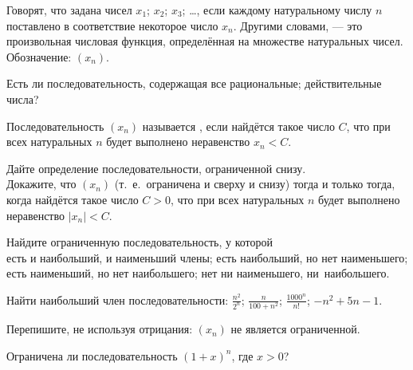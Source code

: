 \documentclass[a4paper,11pt]{article}
\begin{document}


 Говорят, что задана  чисел
$x_1$; $x_2$; $x_3$; \dots ,  если каждому натуральному
числу $n$ поставлено в соответствие некоторое число $x_n$.
Другими словами,  ---
это произвольная числовая
функция, определ\"енная на множестве натуральных чисел.
Обозначение: $(x_n)$.  

Есть ли последовательность, содержащая все  рациональные;  действительные числа?

 Последовательность $(x_n)$ называется ,
если найд\"ется такое число $C$, что при всех натуральных $n$
будет выполнено неравенство $x_n<C$.

 Дайте определение последовательности, ограниченной снизу.\\
 Докажите, что %
$(x_n)$ 
(т.~е.~ограничена и сверху и снизу) тогда и только тогда, когда
найд\"ется такое число $C>0$, что при всех натуральных $n$
будет выполнено неравенство $|x_n|<C$.


 Найдите ограниченную последовательность, у которой\\
  есть и наибольший, и наименьший члены;
  есть наибольший, но нет наименьшего;\\
  есть наименьший, но нет наибольшего;
  нет ни наименьшего, ни~\hbox{наибольшего.}


 Найти наибольший член последовательности:
 $\frac{n^2}{2^n}$;
 $\frac{n}{100+n^2}$;
 $\frac{1000^n}{n!}$;
 $-n^2+5n-1$.


Перепишите, не используя отрицания:
 $(x_n)$ не  является ограниченной.


Ограничена ли последовательность $(1+x)^n$, где $x>0$? %
\end{document}
